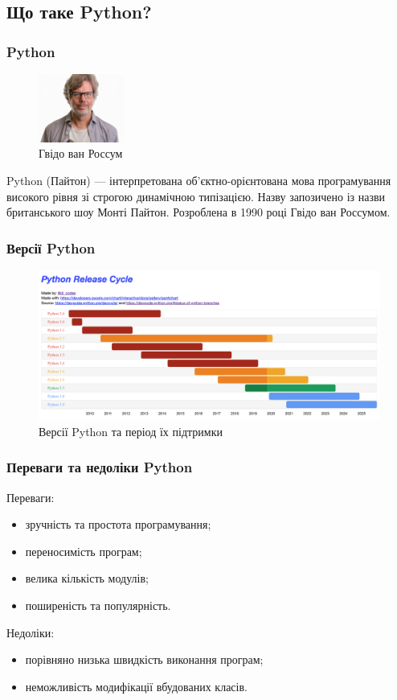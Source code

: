 \subsection{Що таке Python?}
\begin{frame}
\frametitle{Python}
\begin{figure}
\includegraphics[width=0.25\textwidth]{pictures/guido}
\caption{Гвідо ван Россум}
\label{gvido}
\end{figure}
Python (Пайтон) — інтерпретована об'єктно-орієнтована мова програмування високого рівня зі строгою динамічною типізацією.  Назву запозичено із назви британського шоу Монті Пайтон. Розроблена в 1990 році Гвідо ван Россумом. 
\end{frame}

\begin{frame}
\frametitle{Версії Python}
\begin{figure}
  \begin{center}
    \includegraphics[width=\textwidth,height=0.5\textheight]{pictures/python_versions}
  \caption{Версії Python та період їх підтримки}
\label{versions}
  \end{center}
\end{figure}
\end{frame}

\begin{frame}
\frametitle{Переваги та недоліки Python}
Переваги:
\begin{itemize}
  \item зручність та простота програмування;
  \item переносимість програм;
  \item велика кількість модулів;
  \item поширеність та популярність.
\end{itemize}
Недоліки:
\begin{itemize}
  \item порівняно низька швидкість виконання програм;
  \item неможливість модифікації вбудованих класів.
\end{itemize}
\end{frame}

